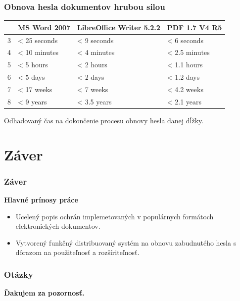 \documentclass[xcolor=dvipsnames]{beamer}
\def\itemtitle#1{{\bfseries#1\smallskip}}
\begin{document}

\begin{frame}
	\frametitle{Obnova hesla dokumentov hrubou silou}
	
	 \begin{table}[h]
	\centering
	\begin{tabular}{|l|l|l|l|}
           \hline
		&\textbf{MS Word 2007}&\textbf{LibreOffice Writer 5.2.2}&\textbf{PDF 1.7 V4 R5}\\
	\hline
		3&< 25 seconds&< 9 seconds&< 6 seconds\\
	\hline
		4&< 10 minutes&< 4 minutes&< 2.5 minutes\\
	\hline
		5&< 5 hours& < 2 hours&< 1.1 hours\\
	\hline
		6&< 5 days&< 2 days&< 1.2 days\\
	\hline
		7&< 17 weeks&< 7 weeks&< 4.2 weeks\\
	\hline
		8&< 9 years&< 3.5 years&< 2.1 years\\
	\hline
           \end{tabular}
	\end{table}
	\hspace{15mm}\scriptsize{Odhadovaný čas na dokončenie procesu obnovy hesla danej dĺžky.}
\end{frame}


\section{Záver}
\begin{frame}
	\frametitle{Záver}

	\itemtitle{Hlavné prínosy práce}
	\begin{itemize}
		\item Ucelený popis ochrán implemetovaných v populárnych formátoch elektronických dokumentov.
		\item Vytvorený funkčný distribuovaný systém na obnovu zabudnutého hesla s dôrazom na použiteľnosť a rozšíriteľnosť.
	\end{itemize}
		
\end{frame}



\begin{frame}
   \frametitle{Otázky}
 	\vspace*{\fill}

 	\begin{center} 		
 		\huge\bfseries{} Ďakujem za pozornosť.\\~\\
 	\end{center}
 	\vspace*{\fill}
 \end{frame}
\end{document}
